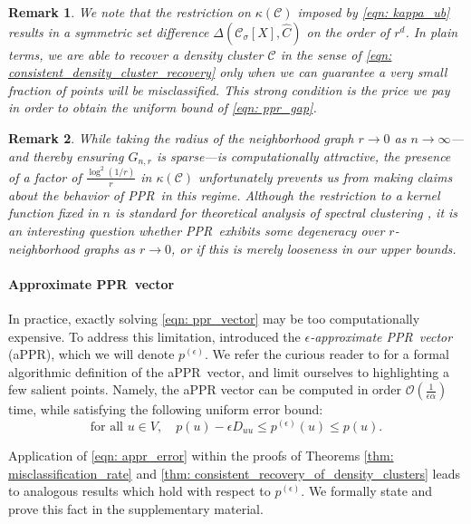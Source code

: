 \documentclass{article}
\newcommand{\1}{\mathbf{1}}
\newcommand{\pbf}{p}        %
\newcommand{\Xbf}{X}             %
\newcommand{\Dbf}{D}
\newcommand{\Cset}{\mathcal{C}}
\newcommand{\Csig}{\Cset_{\sigma}}
\newcommand{\Cest}{\widehat{C}}
\newcommand{\pprspace}{{\sc PPR~}}
\theoremstyle{aldenthm}
\theoremstyle{aldenrmrk}
\newtheorem{remark}{Remark}
\begin{document}
\begin{remark}
	We note that the restriction on $\kappa(\Cset)$ imposed by \eqref{eqn: kappa_ub} results in a symmetric set difference $\Delta(\Csig[\Xbf], \Cest)$ on the order of $r^d$. In plain terms, we are able to recover a density cluster $\Cset$ in the sense of \eqref{eqn: consistent_density_cluster_recovery} only when we can guarantee a very small fraction of points will be misclassified. This strong condition is the price we pay in order to obtain the uniform bound of \eqref{eqn: ppr_gap}.
\end{remark}

\begin{remark}
	While taking the radius of the neighborhood graph $r \to 0$ as $n \to \infty$---and thereby ensuring $G_{n,r}$ is sparse---is computationally attractive, the presence of a factor of $\frac{\log^2(1/r)}{r}$ in $\kappa(\Cset)$ unfortunately prevents us from making claims about the behavior of \pprspace in this regime. Although the restriction to a kernel function fixed in $n$ is standard for theoretical analysis of spectral clustering \cite{schiebinger2015,vonluxburg2008}, it is an interesting question whether \pprspace exhibits some degeneracy over $r$-neighborhood graphs as $r \to 0$, or if this is merely looseness in our upper bounds.
\end{remark}

\paragraph{Approximate \pprspace vector}

In practice, exactly solving \eqref{eqn: ppr_vector} may be too computationally expensive. To address this limitation, \citet{andersen2006} introduced the \emph{$\epsilon$-approximate \pprspace vector} (aPPR), which we will denote $\pbf^{(\epsilon)}$. We refer the curious reader to \cite{andersen2006} for a formal algorithmic definition of the a\pprspace vector, and limit ourselves to highlighting a few salient points. Namely, the aPPR vector can be computed in  order $\mathcal{O}\left(\frac{1}{\epsilon \alpha}\right)$ time, while satisfying the following uniform error bound:
\begin{equation}
\label{eqn: appr_error}
\textrm{for all $u \in V$}, \quad \pbf(u) - \epsilon \Dbf_{uu}\leq \pbf^{(\epsilon)}(u) \leq \pbf(u). 
\end{equation}

Application of \eqref{eqn: appr_error} within the proofs of Theorems \ref{thm: misclassification_rate} and \ref{thm: consistent_recovery_of_density_clusters} leads to analogous results which hold with respect to $\pbf^{(\epsilon)}$. We formally state and prove this fact in the supplementary material.
\end{document}
